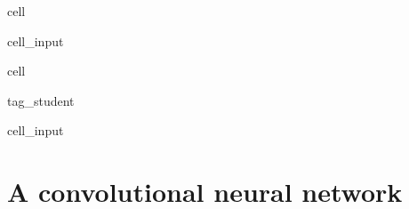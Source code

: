 \documentclass[letterpaper,10pt,english]{jupyterBook}
\begin{document}
\begin{sphinxuseclass}{cell}\begin{sphinxVerbatimInput}

\begin{sphinxuseclass}{cell_input}
\begin{sphinxVerbatim}[commandchars=\\\{\}]
      
\end{sphinxVerbatim}

\end{sphinxuseclass}\end{sphinxVerbatimInput}

\end{sphinxuseclass}
\begin{sphinxuseclass}{cell}
\begin{sphinxuseclass}{tag_student}\begin{sphinxVerbatimInput}

\begin{sphinxuseclass}{cell_input}
\begin{sphinxVerbatim}[commandchars=\\\{\}]
\end{sphinxVerbatim}

\end{sphinxuseclass}\end{sphinxVerbatimInput}

\end{sphinxuseclass}
\end{sphinxuseclass}

\chapter{A convolutional neural network}
\label{\detokenize{notebooks/Tutorial2_ConvolutionalNeuralNetworks/Tutorial2_ConvolutionalNeuralNetworks_student:a-convolutional-neural-network}}
\sphinxAtStartPar
\end{document}
